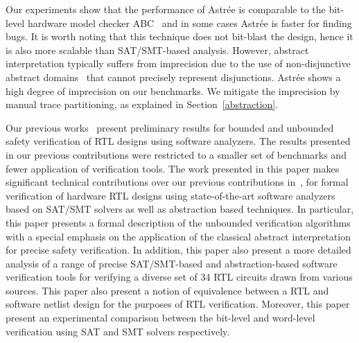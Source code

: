 Our experiments show that the performance of Astr{\'e}e is comparable to the
bit-level hardware model checker ABC~\cite{abc} and in some cases Astr{\'e}e
is faster for finding bugs.  It is worth noting that this technique does not
bit-blast the design, hence it is also more scalable than SAT/SMT-based
analysis.  However, abstract interpretation typically suffers from
imprecision due to the use of non-disjunctive abstract domains~\cite{nd}
that cannot precisely represent disjunctions.  Astr{\'e}e shows a high
degree of imprecision on our benchmarks.  We mitigate the imprecision by
manual trace partitioning, as explained in Section~\ref{abstraction}.

Our previous works~\cite{mkm2015,mskm2016} present preliminary results 
for bounded and unbounded safety verification of RTL designs using 
software analyzers.  The results presented in our previous contributions 
were restricted to a smaller set of benchmarks and fewer application of 
verification tools.  
%  
The work presented in this paper makes significant technical contributions 
over our previous contributions in~\cite{mkm2015,mskm2016}, for formal 
verification of hardware RTL designs using state-of-the-art software analyzers 
based on SAT/SMT solvers as well as abstraction based techniques. 
%
In particular, this paper presents a formal description of the unbounded 
verification algorithms with a special emphasis on the application of the 
classical abstract interpretation for precise safety verification.  In addition, 
this paper also present a more detailed analysis of a range of precise SAT/SMT-based 
and abstraction-based software verification tools for verifying a diverse set of 34 RTL 
circuits drawn from various sources.  This paper also present a notion of 
equivalence between a RTL and software netlist design for the purposes of RTL 
verification.  Moreover, this paper present an experimental comparison between 
the bit-level and word-level verification using SAT and SMT solvers respectively. 
%
